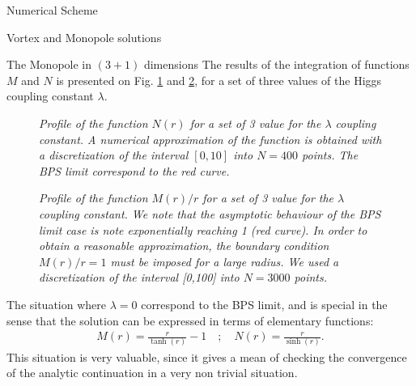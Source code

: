 \begin{section}{Numerical Scheme}
\begin{subsection}{Vortex and Monopole solutions}
\begin{subsubsection}{The Monopole in $(3+1)$ dimensions}
      The results of the integration of functions $M$ and $N$ is
      presented on Fig. \ref{fig:2d_monopole_f} and
      \ref{fig:2d_monopole_h}, for a set of three values of the Higgs
      coupling constant $\lambda$.
      \begin{figure}[!ht]
        \begin{center}
          
          \caption{\em Profile of the function $N(r)$ for a set of 3
            value for the $\lambda$ coupling constant. A numerical
            approximation of the function is obtained with a
            discretization of the interval $[0,10]$ into $N = 400$
            points. The BPS limit correspond to the red curve.}
          \label{fig:2d_monopole_f}
        \end{center}
      \end{figure}
      
      \begin{figure}[!ht]
        \begin{center}
          
          \caption{\em Profile of the function $M(r)/r$ for a set of 3
            value for the $\lambda$ coupling constant.  We note that
            the asymptotic behaviour of the BPS limit case is note
            exponentially reaching 1 (red curve). In order to obtain a
            reasonable approximation, the boundary condition $M(r)/r =
            1$ must be imposed for a large radius. We used a
            discretization of the interval [0,100] into $N=3000$
            points.}
          \label{fig:2d_monopole_h}
        \end{center}
      \end{figure}
      The situation where $\lambda = 0$ correspond to the BPS limit,
      and is special in the sense that the solution can be expressed
      in terms of elementary functions:
      \begin{align}
        M(r) = \frac{r}{\tanh(r)}-1\quad ; \quad N(r) = \frac{r}{\sinh(r)}.
      \end{align}
      This situation is very valuable, since it gives a mean of
      checking the convergence of the analytic continuation in a
      very non trivial situation.
    \end{subsubsection}
  \end{subsection}
\end{section}
